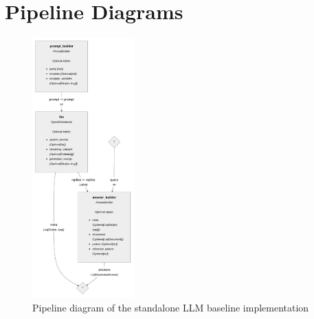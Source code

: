 








\chapter{Pipeline Diagrams}

\begin{figure}[h]
  \centering
  \includegraphics[width=0.35\textwidth]{images/baseline_llm.pdf}
  \caption{Pipeline diagram of the standalone LLM baseline implementation}
  \label{fig:pipeline_llm}
\end{figure}

